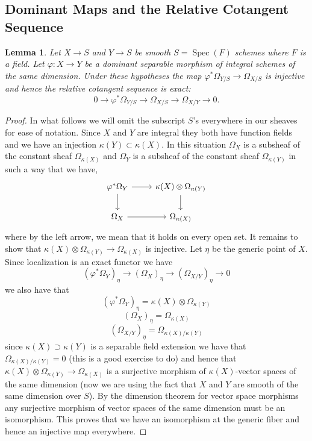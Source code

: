 \documentclass[12pt]{article}
\numberwithin{equation}{section}
\newtheorem{lemma}[theorem]{Lemma}
\theoremstyle{definition}
\theoremstyle{remark}
\newcommand{\Spec}{\operatorname{Spec}}
\begin{document}
\subsection{Dominant Maps and the Relative Cotangent Sequence}
\begin{lemma}
	Let $X\to S$ and $Y\to S$ be smooth $S=\Spec(F)$ schemes where $F$ is a field. 
	Let $\varphi:X\to Y$ be a dominant separable morphism of integral schemes of the same dimension.
	Under these hypotheses the map $\varphi^*\Omega_{Y/S} \to \Omega_{X/S}$ is injective and hence the relative cotangent sequence is exact: 
	$$ 0 \to \varphi^*\Omega_{Y/S} \to \Omega_{X/S} \to \Omega_{X/Y} \to 0. $$
\end{lemma}
\begin{proof}
	In what follows we will omit the subscript $S$'s everywhere in our sheaves for ease of notation.
	Since $X$ and $Y$ are integral they both have function fields and we have an injection $\kappa(Y) \subset \kappa(X)$. 
	In this situation $\Omega_X$ is a subsheaf of the constant sheaf $\Omega_{\kappa(X)}$ and $\Omega_Y$ is a subsheaf of the constant sheaf $\Omega_{\kappa(Y)}$ in such a way that we have,
	$$\begin{tikzcd}
	\varphi^*\Omega_Y \ar[r] \ar[d] & \kappa(X)\otimes\Omega_{\kappa(Y)} \ar[d]\\
	\Omega_X \ar[r] & \Omega_{\kappa(X)} 
	\end{tikzcd}$$
	where by the left arrow, we mean that it holds on every open set. 
	It remains to show that $\kappa(X)\otimes \Omega_{\kappa(Y)} \to \Omega_{\kappa(X)}$ is injective.
	Let $\eta$ be the generic point of $X$.
	Since localization is an exact functor we have 
	$$ (\varphi^*\Omega_Y)_{\eta} \to (\Omega_X)_{\eta} \to (\Omega_{X/Y})_{\eta} \to 0 $$
	we also have that 
	$$ (\varphi^*\Omega_Y)_{\eta} = \kappa(X) \otimes \Omega_{\kappa(Y)} $$ 
	$$ (\Omega_X)_{\eta} = \Omega_{\kappa(X)}$$
	$$ (\Omega_{X/Y})_{\eta} = \Omega_{\kappa(X)/\kappa(Y)} $$
	since $\kappa(X)\supset \kappa(Y)$ is a separable field extension we have that 
	$\Omega_{\kappa(X)/\kappa(Y)}=0$ (this is a good exercise to do) and hence that $\kappa(X) \otimes \Omega_{\kappa(Y)} \to \Omega_{\kappa(X)}$ is a surjective morphism of $\kappa(X)$-vector spaces of the same dimension (now we are using the fact that $X$ and $Y$ are smooth of the same dimension over $S$).
	By the dimension theorem for vector space morphisms any surjective morphism of vector spaces of the same dimension must be an isomorphism.
	This proves that we have an isomorphism at the generic fiber and hence an injective map everywhere.
\end{proof}
\end{document}
